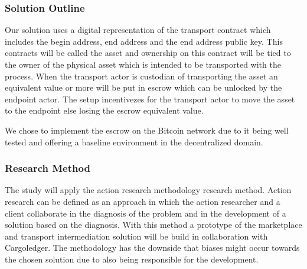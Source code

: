 
\subsubsection{Solution Outline}

Our solution uses a digital representation of the transport contract which includes the begin address, end address and the end address public key. This contracts will be called the asset and ownership on this contract will be tied to the owner of the physical asset which is intended to be transported with the process. When the transport actor is custodian of transporting the asset an equivalent value or more will be put in escrow which can be unlocked by the endpoint actor. The setup incentivezes for the transport actor to move the asset to the endpoint else losing the escrow equivalent value. \par
We chose to implement the escrow on the Bitcoin network due to it being well tested and offering a baseline environment in the decentralized domain.

%

\subsubsection{Research Method}

The study will apply the action research methodology research method. Action research can be defined as an approach in which the action researcher and a client collaborate in the diagnosis of the problem and in the development of a solution based on the diagnosis. With this method a prototype of the marketplace and transport intermediation solution will be build in collaboration with Cargoledger. The methodology has the downside that biases might occur towards the chosen solution due to also being responsible for the development.\par

